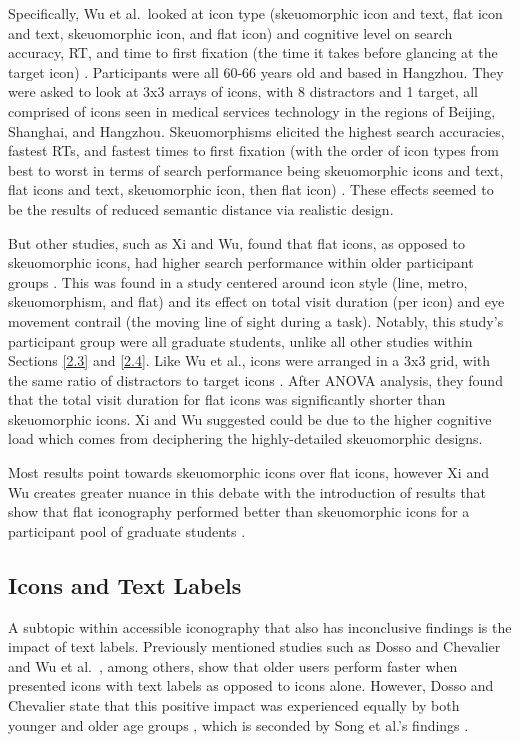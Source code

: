 \documentclass[12pt,twoside]{reedthesis}
\begin{document}
        Specifically, Wu et al.~looked at icon type (skeuomorphic icon and text, flat icon and text, skeuomorphic icon, and flat icon) and cognitive level on search accuracy, RT, and time to first fixation (the time it takes before glancing at the target icon) \cite{wu_how_2022}. Participants were all 60-66 years old and based in Hangzhou. They were asked to look at 3x3 arrays of icons, with 8 distractors and 1 target, all comprised of icons seen in medical services technology in the regions of Beijing, Shanghai, and Hangzhou. Skeuomorphisms elicited the highest search accuracies, fastest RTs, and fastest times to first fixation (with the order of icon types from best to worst in terms of search performance being skeuomorphic icons and text, flat icons and text, skeuomorphic icon, then flat icon) \cite{wu_how_2022}. These effects seemed to be the results of reduced semantic distance via realistic design. 

        But other studies, such as Xi and Wu, found that flat icons, as opposed to skeuomorphic icons, had higher search performance within older participant groups \cite{xi_influence_2018}. This was found in a study centered around icon style (line, metro, skeuomorphism, and flat) and its effect on total visit duration (per icon) and eye movement contrail (the moving line of sight during a task). Notably, this study's participant group were all graduate students, unlike all other studies within Sections \ref{2.3} and \ref{2.4}. Like Wu et al.\@, icons were arranged in a 3x3 grid, with the same ratio of distractors to target icons \cite{wu_how_2022}. After ANOVA analysis, they found that the total visit duration for flat icons was significantly shorter than skeuomorphic icons. Xi and Wu suggested could be due to the higher cognitive load which comes from deciphering the highly-detailed skeuomorphic designs. 

        Most results point towards skeuomorphic icons over flat icons, however Xi and Wu creates greater nuance in this debate with the introduction of results that show that flat iconography performed better than skeuomorphic icons for a participant pool of graduate students \cite{xi_influence_2018}.

\subsection{Icons and Text Labels}\label{2.3.3}

    A subtopic within accessible iconography that also has inconclusive findings is the impact of text labels. Previously mentioned studies such as Dosso and Chevalier \cite{dosso_how_2021} and Wu et al.~\cite{wu_how_2022}, among others, show that older users perform faster when presented icons with text labels as opposed to icons alone. However, Dosso and Chevalier state that this positive impact was experienced equally by both younger and older age groups \cite{dosso_how_2021}, which is seconded by Song et al.\@'s findings \cite{song_developing_2024}. 
    
\end{document}
